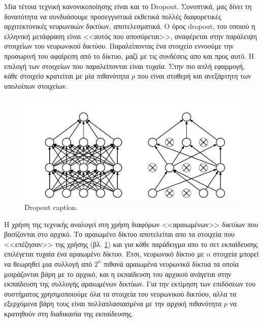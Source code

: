 Μία τέτοια τεχνική κανονικοποίησης είναι και το Dropout.
Συνοπτικά, μας δίνει τη δυνατότητα να συνδυάσουμε προσεγγιστικά εκθετικά πολλές διαφορετικές αρχιτεκτονικές νευρωνικών δικτύων, αποτελεσματικά.
Ο όρος dropout, του οποιού η ελληνική μετάφραση είναι <<αυτός που αποσύρεται>>, αναφέρεται στην παράλειψη στοιχείων του νευρωνικού δικτύου.
Παραλείποντας ένα στοιχείο εννοούμε την προσωρινή του αφαίρεση από το δίκτυο, μαζί με τις συνδέσεις απο και προς αυτό.
Η επιλογή των στοιχείων που παραλείπονται είναι τυχαία.
Στην πιο απλή εφαρμογή, κάθε στοιχείο κρατείται με μία πιθανότητα $p$ που είναι σταθερή και ανεξάρτητη των υπολοίπων στοιχείων.

\begin{figure}[tph]
	\includegraphics[width=\textwidth, keepaspectratio]{images/dropout.png}
	\centering 
	\caption{Dropout caption.}
	\label{fig:dropout}
\end{figure}

Η χρήση της τεχνικής  αναλογεί στη χρήση διαφόρων <<αραιωμένων>> δικτύων που βασίζονται στο αρχικό.
Το αραιωμένο δίκτυο αποτελείται απο τα στοιχεία που <<επέζησαν>> της χρήσης  (βλ. \ref{fig:dropout}) και για κάθε παράδειγμα απο το σετ εκπαίδευσης επιλέγεται τυχαία ένα αραιωμένο δίκτυο.
Έτσι, νευρωνικό δίκτυο με $n$ στοιχεία μπορεί να θεωρηθεί μια συλλογή από $2^n$ πιθανά αραιωμένα νευρωνικά δίκτυα τα οποία μοιράζονται βάρη με το αρχικό, και η εκπαίδευση του αρχικού ανάγεται στην εκπαίδευση της συλλογής αραιωμένων δικτύων. 
Για την εκτίμηση των επιδόσεων του συστήματος χρησιμοποιούμε όλα τα στοιχεία του νευρωνικού δικτύου, αλλα τα εξερχόμενα βάρη τους είναι πολλαπλασιασμένα με την αρχική πιθανότητα $p$ να κρατηθούν στη διαδικασία της εκπαίδευσης.